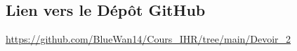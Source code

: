 \documentclass[a4paper,12pt]{article}
\begin{document}
    
    \subsection{Lien vers le Dépôt GitHub}
    \url{https://github.com/BlueWan14/Cours_IHR/tree/main/Devoir_2}



    \newpage
    \printbibliography
\end{document}
